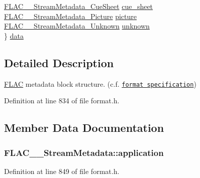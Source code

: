 \begin{DoxyCompactItemize}
\begin{tabbing}
\>\hyperlink{struct_f_l_a_c_____stream_metadata___cue_sheet}{FLAC\_\_StreamMetadata\_CueSheet} \hyperlink{struct_f_l_a_c_____stream_metadata_a68e7d388eeb7e35076e016370a74e0ec}{cue\_sheet}\\
\>\hyperlink{struct_f_l_a_c_____stream_metadata___picture}{FLAC\_\_StreamMetadata\_Picture} \hyperlink{struct_f_l_a_c_____stream_metadata_a203cf5cce24097ef96efd5dd3bb7c8e7}{picture}\\
\>\hyperlink{struct_f_l_a_c_____stream_metadata___unknown}{FLAC\_\_StreamMetadata\_Unknown} \hyperlink{struct_f_l_a_c_____stream_metadata_ac29528515ea884b108a813a6609515bd}{unknown}\\
\} \hyperlink{struct_f_l_a_c_____stream_metadata_a1029e424f4f3814c4465384366afd3f2}{data}\\

\end{tabbing}\end{DoxyCompactItemize}


\subsection{Detailed Description}
\hyperlink{namespace_f_l_a_c}{F\+L\+AC} metadata block structure. (c.\+f. \href{../format.html#metadata_block}{\tt format specification}) 

Definition at line 834 of file format.\+h.



\subsection{Member Data Documentation}
\subsubsection[{\texorpdfstring{application}{application}}]{ F\+L\+A\+C\+\_\+\+\_\+\+Stream\+Metadata\+::application}\hypertarget{struct_f_l_a_c_____stream_metadata_af16b029d4a476aeb46f9a215e2cce462}{}\label{struct_f_l_a_c_____stream_metadata_af16b029d4a476aeb46f9a215e2cce462}


Definition at line 849 of file format.\+h.


